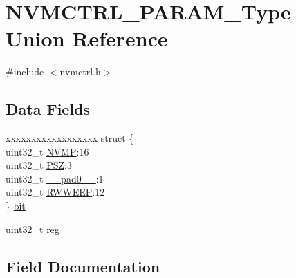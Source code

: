 \hypertarget{union_n_v_m_c_t_r_l___p_a_r_a_m___type}{}\section{N\+V\+M\+C\+T\+R\+L\+\_\+\+P\+A\+R\+A\+M\+\_\+\+Type Union Reference}
\label{union_n_v_m_c_t_r_l___p_a_r_a_m___type}


{\ttfamily \#include $<$nvmctrl.\+h$>$}

\subsection*{Data Fields}
\begin{DoxyCompactItemize}
\item 
\begin{tabbing}
xx\=xx\=xx\=xx\=xx\=xx\=xx\=xx\=xx\=\kill
struct \{\\
\>uint32\_t \mbox{\hyperlink{union_n_v_m_c_t_r_l___p_a_r_a_m___type_a6f8a28fda806303fec39ea5277962697}{NVMP}}:16\\
\>uint32\_t \mbox{\hyperlink{union_n_v_m_c_t_r_l___p_a_r_a_m___type_a8b696f9f7cfac7fa11c46bd8ddcea521}{PSZ}}:3\\
\>uint32\_t \mbox{\hyperlink{union_n_v_m_c_t_r_l___p_a_r_a_m___type_a3e57c2ef1c3ffb36722f000cc1156824}{\_\_pad0\_\_}}:1\\
\>uint32\_t \mbox{\hyperlink{union_n_v_m_c_t_r_l___p_a_r_a_m___type_a28317a7885dcf4d4bd96aace1056de2b}{RWWEEP}}:12\\
\} \mbox{\hyperlink{union_n_v_m_c_t_r_l___p_a_r_a_m___type_a60a923b26e2f162c3df7cfbff980317a}{bit}}\\

\end{tabbing}\item 
uint32\+\_\+t \mbox{\hyperlink{union_n_v_m_c_t_r_l___p_a_r_a_m___type_a6b91636401516a477989a336376d7b40}{reg}}
\end{DoxyCompactItemize}


\subsection{Field Documentation}
\mbox{\label{union_n_v_m_c_t_r_l___p_a_r_a_m___type_a3e57c2ef1c3ffb36722f000cc1156824}} 
